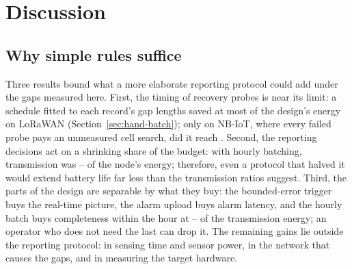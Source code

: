 \section{Discussion}
\label{sec:discussion}

\subsection{Why simple rules suffice}
\label{sec:disc-limits-protocol}
Three results bound what a more elaborate reporting protocol could add under the gaps measured here. First, the timing of recovery probes is near its limit: a schedule fitted to each record's gap lengths saved at most \probeSaveLoraMax{} of the design's energy on LoRaWAN (Section~\ref{sec:hand-batch}); only on NB-IoT, where every failed probe pays an unmeasured cell search, did it reach \probeSaveNbMax. Second, the reporting decisions act on a shrinking share of the budget: with hourly batching, transmission was \txShareFinalMin--\txShareFinalMax{} of the node's energy; therefore, even a protocol that halved it would extend battery life far less than the transmission ratios suggest. Third, the parts of the design are separable by what they buy: the bounded-error trigger buys the real-time picture, the alarm upload buys alarm latency, and the hourly batch buys completeness within the hour at \noBatchSaveMin--\noBatchSaveMax{} of the transmission energy; an operator who does not need the last can drop it. The remaining gains lie outside the reporting protocol: in sensing time and sensor power, in the network that causes the gaps, and in measuring the target hardware.

